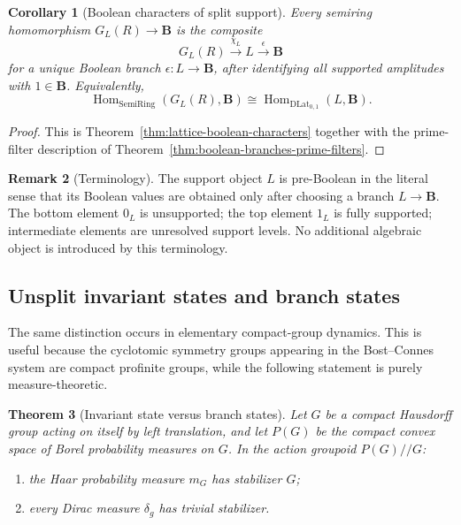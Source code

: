 \documentclass[11pt]{amsart}
\numberwithin{equation}{section}
\newtheorem{theorem}{Theorem}[section]
\newtheorem{corollary}[theorem]{Corollary}
\theoremstyle{definition}
\newtheorem{remark}[theorem]{Remark}
\newcommand{\B}{\mathbf B}
\newcommand{\Hom}{\operatorname{Hom}}
\DeclareMathOperator{\SemiRing}{SemiRing}
\begin{document}
\begin{corollary}[Boolean characters of split support]
\label{cor:boolean-characters-factor-through-branches}
Every semiring homomorphism $G_L(R)\to\B$ is the composite
\[
G_L(R)\xrightarrow{\chi_L}L\xrightarrow{\epsilon}\B
\]
for a unique Boolean branch $\epsilon:L\to\B$, after identifying all
supported amplitudes with $1\in\B$.  Equivalently,
\[
\Hom_{\SemiRing}(G_L(R),\B)
\cong
\Hom_{\mathrm{DLat}_{0,1}}(L,\B).
\]
\end{corollary}

\begin{proof}
This is Theorem~\ref{thm:lattice-boolean-characters} together with the
prime-filter description of Theorem~\ref{thm:boolean-branches-prime-filters}.
\end{proof}

\begin{remark}[Terminology]
The support object $L$ is pre-Boolean in the literal sense that its
Boolean values are obtained only after choosing a branch $L\to\B$.  The
bottom element $0_L$ is unsupported; the top element $1_L$ is fully
supported; intermediate elements are unresolved support levels.  No
additional algebraic object is introduced by this terminology.
\end{remark}

\subsection{Unsplit invariant states and branch states}

The same distinction occurs in elementary compact-group dynamics.  This
is useful because the cyclotomic symmetry groups appearing in the
Bost--Connes system are compact profinite groups, while the following
statement is purely measure-theoretic.

\begin{theorem}[Invariant state versus branch states]
\label{thm:haar-dirac-branch}
Let $G$ be a compact Hausdorff group acting on itself by left translation,
and let $P(G)$ be the compact convex space of Borel probability measures on
$G$.  In the action groupoid $P(G)//G$:
\begin{enumerate}[label=\textup{(\arabic*)}]
\item the Haar probability measure $m_G$ has stabilizer $G$;
\item every Dirac measure $\delta_g$ has trivial stabilizer.
\end{enumerate}
\end{theorem}
\end{document}
